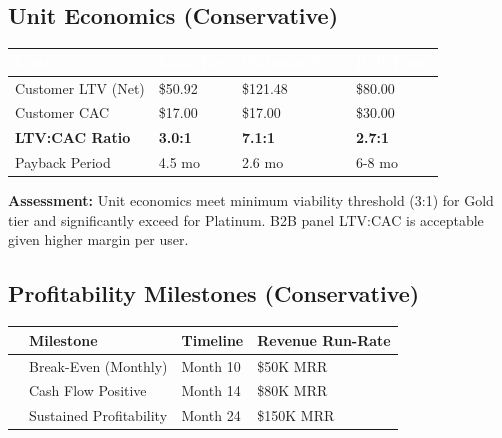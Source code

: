 \documentclass[11pt,a4paper]{article}
\begin{document}
\subsection{Unit Economics (Conservative)}

\begin{center}
\begin{tabular}{L{4cm} R{2.5cm} R{2.5cm} R{2.5cm}}
    \toprule
    \textcolor{white}{\textbf{Metric}} & \textcolor{white}{\textbf{Gold Tier}} & \textcolor{white}{\textbf{Platinum Tier}} & \textcolor{white}{\textbf{B2B Panel}}\\
    \midrule
    Customer LTV (Net) & \$50.92 & \$121.48 & \$80.00\\
    Customer CAC & \$17.00 & \$17.00 & \$30.00\\
    \textbf{LTV:CAC Ratio} & \textbf{3.0:1} & \textbf{7.1:1} & \textbf{2.7:1}\\
    Payback Period & 4.5 mo & 2.6 mo & 6-8 mo\\
    \bottomrule
\end{tabular}
\end{center}

\begin{successbox}
\textbf{Assessment:} Unit economics meet minimum viability threshold (3:1) for Gold tier and significantly exceed for Platinum. B2B panel LTV:CAC is acceptable given higher margin per user.
\end{successbox}

\subsection{Profitability Milestones (Conservative)}

\begin{center}
\begin{tabular}{C{1cm} L{5cm} C{2.5cm} L{3cm}}
    \toprule
    & \textbf{Milestone} & \textbf{Timeline} & \textbf{Revenue Run-Rate}\\
    \midrule
    \textcolor{milored}{\Large{}} & Break-Even (Monthly) & Month 10 & \$50K MRR\\
    \textcolor{miloyellow}{\Large{}} & Cash Flow Positive & Month 14 & \$80K MRR\\
    \textcolor{milogreen}{\Large{}} & Sustained Profitability & Month 24 & \$150K MRR\\
    \bottomrule
\end{tabular}
\end{center}
\end{document}
